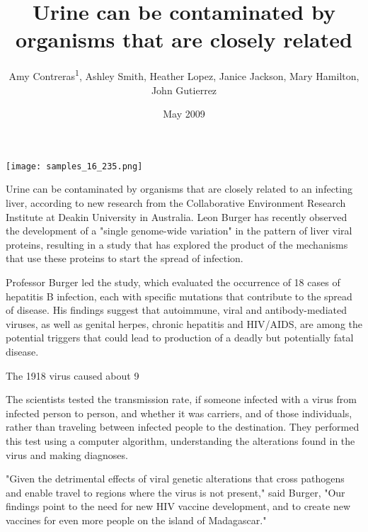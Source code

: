 \documentclass{article}
\title{Urine can be contaminated by organisms that are closely related}
\author{Amy Contreras\textsuperscript{1},  Ashley Smith,  Heather Lopez,  Janice Jackson,  Mary Hamilton,  John Gutierrez}
\affil{\textsuperscript{1}University of California, Los Angeles}
\date{May 2009}
\begin{document}
\maketitle

\begin{center}
\begin{minipage}{0.75\linewidth}
\texttt{[image: samples\_16\_235.png]}
\end{minipage}
\end{center}

Urine can be contaminated by organisms that are closely related to an infecting liver, according to new research from the Collaborative Environment Research Institute at Deakin University in Australia. Leon Burger has recently observed the development of a "single genome-wide variation" in the pattern of liver viral proteins, resulting in a study that has explored the product of the mechanisms that use these proteins to start the spread of infection.

Professor Burger led the study, which evaluated the occurrence of 18 cases of hepatitis B infection, each with specific mutations that contribute to the spread of disease. His findings suggest that autoimmune, viral and antibody-mediated viruses, as well as genital herpes, chronic hepatitis and HIV/AIDS, are among the potential triggers that could lead to production of a deadly but potentially fatal disease.

The 1918 virus caused about 9%

The scientists tested the transmission rate, if someone infected with a virus from infected person to person, and whether it was carriers, and of those individuals, rather than traveling between infected people to the destination. They performed this test using a computer algorithm, understanding the alterations found in the virus and making diagnoses.

"Given the detrimental effects of viral genetic alterations that cross pathogens and enable travel to regions where the virus is not present," said Burger, "Our findings point to the need for new HIV vaccine development, and to create new vaccines for even more people on the island of Madagascar."
\end{document}
